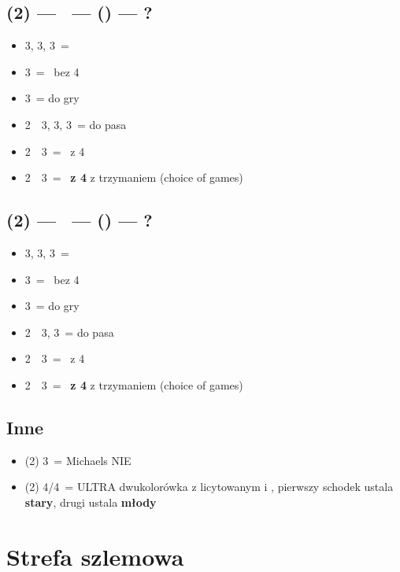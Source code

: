 \documentclass[12pt, a4paper]{article}
\begin{document}
\subsection*{(2\spades) --- \dbl\ --- (\passx) --- ?}
\begin{itemize}
    \item 3\clubs, 3\diams, 3\hearts\ = \inv
    \item 3\spades\ = \gf\ bez 4\hearts
    \item 3\nt\ = do gry \br
    \item 2\nt\ \rightarrow\ 3\clubs, 3\diams, 3\hearts\ = do pasa
    \item 2\nt\ \rightarrow\ 3\spades\ = \gf\ z 4\hearts
    \item 2\nt\ \rightarrow\ 3\nt\ = \gf\ \textbf{z 4\hearts} z trzymaniem (choice of games)
\end{itemize}

\subsection*{(2\hearts) --- \dbl\ --- (\passx) --- ?}
\begin{itemize}
    \item 3\clubs, 3\diams, 3\spades\ = \inv
    \item 3\hearts\ = \gf\ bez 4\spades
    \item 3\nt\ = do gry \br
    \item 2\nt\ \rightarrow\ 3\clubs, 3\diams\ = do pasa
    \item 2\nt\ \rightarrow\ 3\hearts\ = \gf\ z 4\spades
    \item 2\nt\ \rightarrow\ 3\nt\ = \gf\ \textbf{z 4\spades} z trzymaniem (choice of games)
\end{itemize}

\subsection*{Inne}
\begin{itemize}
    \item (2\hearts) 3\hearts\ = Michaels NIE \gf
    \item (2\hearts) 4\clubs/4\diams\ = ULTRA dwukolorówka z licytowanym i \spades,
    pierwszy schodek ustala \textbf{stary}, drugi ustala \textbf{młody}
\end{itemize}


\pagebreak
\section{Strefa szlemowa}
\end{document}
